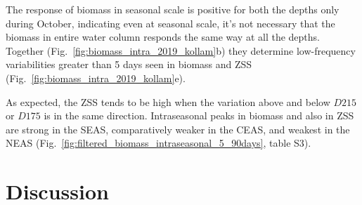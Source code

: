\documentclass[authoryear,review,11pt]{elsarticle}
\newcommand{\chla}{chl-{\emph{a}}}
\begin{document}
The response of biomass in seasonal scale is positive for both the depths only during October, indicating even at seasonal scale, it’s not necessary that the biomass in entire water column responds the same way at all the depths. Together (Fig.~\ref{fig:biomass_intra_2019_kollam}b) they determine low-frequency variabilities greater than 5 days seen in biomass and ZSS (Fig.~\ref{fig:biomass_intra_2019_kollam}e).

As expected, the ZSS tends to be high when the variation above and below $D215$ or $D175$ is in the same direction. 
Intraseasonal peaks in biomass and also in ZSS are strong in the SEAS, comparatively weaker in the CEAS, and weakest in the NEAS (Fig.~\ref{fig:filtered_biomass_intraseasonal_5_90days}, table S3). 








 
 

\section{Discussion}
\label{sec:discuss}
\end{document}
